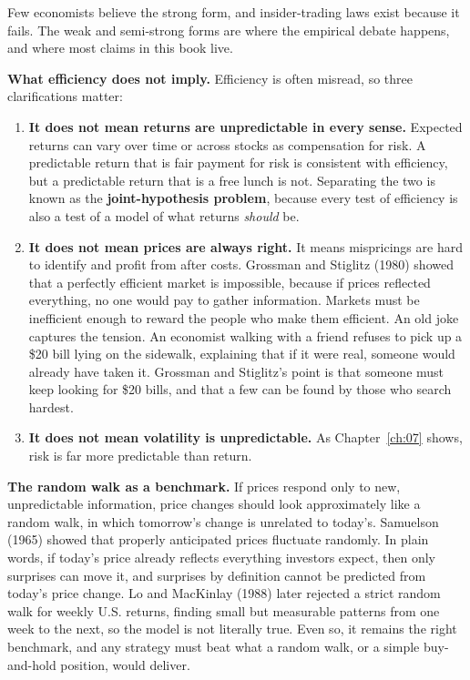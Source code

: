 Few economists believe the strong form, and insider-trading laws exist because it fails. The weak and semi-strong forms are where the empirical debate happens, and where most claims in this book live.

\textbf{What efficiency does not imply.} Efficiency is often misread, so three clarifications matter:

\begin{enumerate}
  \item \textbf{It does not mean returns are unpredictable in every sense.} Expected returns can vary over time or across stocks as compensation for risk. A predictable return that is fair payment for risk is consistent with efficiency, but a predictable return that is a free lunch is not. Separating the two is known as the \textbf{joint-hypothesis problem}, because every test of efficiency is also a test of a model of what returns \emph{should} be.
  \item \textbf{It does not mean prices are always right.} It means mispricings are hard to identify and profit from after costs. Grossman and Stiglitz (1980) showed that a perfectly efficient market is impossible, because if prices reflected everything, no one would pay to gather information. Markets must be inefficient enough to reward the people who make them efficient. An old joke captures the tension. An economist walking with a friend refuses to pick up a \$20 bill lying on the sidewalk, explaining that if it were real, someone would already have taken it. Grossman and Stiglitz's point is that someone must keep looking for \$20 bills, and that a few can be found by those who search hardest.
  \item \textbf{It does not mean volatility is unpredictable.} As Chapter~\ref{ch:07} shows, risk is far more predictable than return.
\end{enumerate}

\textbf{The random walk as a benchmark.} If prices respond only to new, unpredictable information, price changes should look approximately like a random walk, in which tomorrow's change is unrelated to today's. Samuelson (1965) showed that properly anticipated prices fluctuate randomly. In plain words, if today's price already reflects everything investors expect, then only surprises can move it, and surprises by definition cannot be predicted from today's price change. Lo and MacKinlay (1988) later rejected a strict random walk for weekly U.S. returns, finding small but measurable patterns from one week to the next, so the model is not literally true. Even so, it remains the right benchmark, and any strategy must beat what a random walk, or a simple buy-and-hold position, would deliver.

